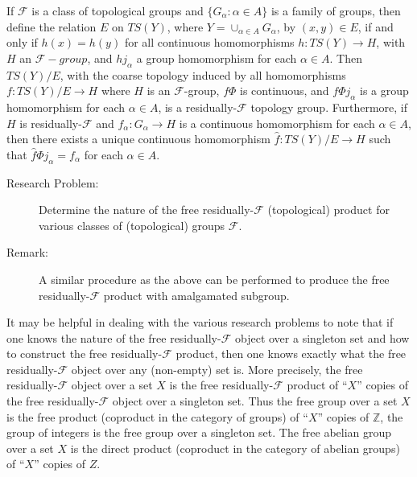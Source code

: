 \documentclass{article}
\begin{document}
If $\mathcal{F}$ is a class of topological groups and $\{G_{\alpha}: \alpha \in A\}$ is a family of groups, then define the relation $E$ on $TS(Y)$, where $Y= \cup_{\alpha \in A} G_{\alpha}$, by $(x,y) \in E$, if and only if $h(x) = h(y)$ for all continuous homomorphisms $h: TS(Y) \rightarrow H$, with $H$ an $\mathcal{F}-group$, and $hj_{\alpha}$ a group homomorphism for each $\alpha \in A$. Then $TS(Y) / E$, with the coarse topology induced by all homomorphisms $f: TS(Y)/E \rightarrow H$ where $H$ is an $\mathcal{F}$-group, $f \Phi$ is continuous, and $f \Phi j_{\alpha}$ is a group homomorphism for each $\alpha \in A$, is a residually-$\mathcal{F}$ topology group. Furthermore, if $H$ is residually-$\mathcal{F}$ and $f_{\alpha}: G_{\alpha} \rightarrow H$ is a continuous homomorphism for each $\alpha \in A$, then there exists a unique continuous homomorphism $\hat{f}: TS(Y)/E \rightarrow H$ such that $\hat{f} \Phi j_{\alpha} = f_{\alpha}$ for each $\alpha \in A$.

\begin{description}

\item[Research Problem:] Determine the nature of the free residually-$\mathcal{F}$ (topological) product for various classes of (topological) groups $\mathcal{F}$.

\item[Remark:] A similar procedure as the above can be performed to produce the free residually-$\mathcal{F}$ product with amalgamated subgroup.

\end{description}

It may be helpful in dealing with the various research problems to note that if one knows the nature of the free residually-$\mathcal{F}$ object over a singleton set and how to construct the free residually-$\mathcal{F}$ product, then one knows exactly what the free residually-$\mathcal{F}$ object over any (non-empty) set is. More precisely, the free residually-$\mathcal{F}$ object over a set $X$ is the free residually-$\mathcal{F}$ product of ``$X$'' copies of the free residually-$\mathcal{F}$ object over a singleton set. Thus the free group over a set $X$ is the free product (coproduct in the category of groups) of ``$X$'' copies of $\mathbb{Z}$, the group of integers is the free group over a singleton set. The free abelian group over a set $X$ is the direct product (coproduct in the category of abelian groups) of ``$X$'' copies of $Z$.
\end{document}
